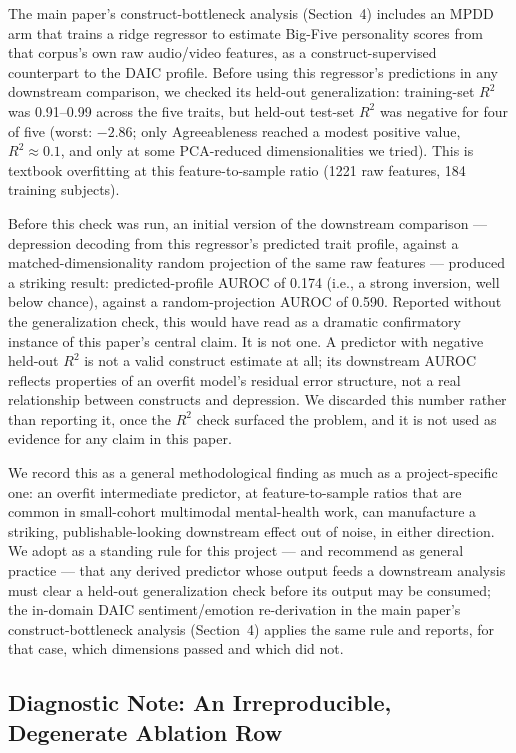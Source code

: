 \documentclass[letterpaper]{article}
\begin{document}
The main paper's construct-bottleneck analysis (Section~4) includes an MPDD arm that trains a ridge regressor to estimate Big-Five personality scores from that corpus's own raw audio/video features, as a construct-supervised counterpart to the DAIC profile. Before using this regressor's predictions in any downstream comparison, we checked its held-out generalization: training-set $R^2$ was 0.91--0.99 across the five traits, but held-out test-set $R^2$ was negative for four of five (worst: $-2.86$; only Agreeableness reached a modest positive value, $R^2 \approx 0.1$, and only at some PCA-reduced dimensionalities we tried). This is textbook overfitting at this feature-to-sample ratio (1221 raw features, 184 training subjects).

Before this check was run, an initial version of the downstream comparison — depression decoding from this regressor's predicted trait profile, against a matched-dimensionality random projection of the same raw features — produced a striking result: predicted-profile AUROC of 0.174 (i.e., a strong inversion, well below chance), against a random-projection AUROC of 0.590. Reported without the generalization check, this would have read as a dramatic confirmatory instance of this paper's central claim. It is not one. A predictor with negative held-out $R^2$ is not a valid construct estimate at all; its downstream AUROC reflects properties of an overfit model's residual error structure, not a real relationship between constructs and depression. We discarded this number rather than reporting it, once the $R^2$ check surfaced the problem, and it is not used as evidence for any claim in this paper.

We record this as a general methodological finding as much as a project-specific one: an overfit intermediate predictor, at feature-to-sample ratios that are common in small-cohort multimodal mental-health work, can manufacture a striking, publishable-looking downstream effect out of noise, in either direction. We adopt as a standing rule for this project — and recommend as general practice — that any derived predictor whose output feeds a downstream analysis must clear a held-out generalization check before its output may be consumed; the in-domain DAIC sentiment/emotion re-derivation in the main paper's construct-bottleneck analysis (Section~4) applies the same rule and reports, for that case, which dimensions passed and which did not.

\subsection{Diagnostic Note: An Irreproducible, Degenerate Ablation Row}
\end{document}
